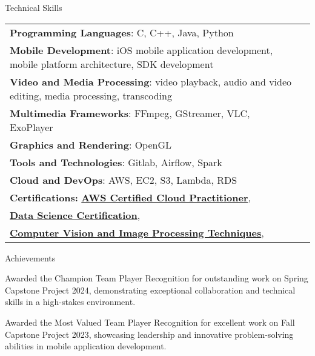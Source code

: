 \documentclass{resume} %
\begin{document}
    \begin{rSection}{Technical Skills}
        \begin{tabular}{ @{} l @{\hspace{1ex}} l }
                                \textbf{Programming Languages}: C, C++, Java, Python\\
                                \textbf{Mobile Development}: iOS mobile application development, mobile platform architecture, SDK development\\
                                \textbf{Video and Media Processing}: video playback, audio and video editing, media processing, transcoding\\
                                \textbf{Multimedia Frameworks}: FFmpeg, GStreamer, VLC, ExoPlayer\\
                                \textbf{Graphics and Rendering}: OpenGL\\
                                \textbf{Tools and Technologies}: Gitlab, Airflow, Spark\\
                                \textbf{Cloud and DevOps}: AWS, EC2, S3, Lambda, RDS\\
                        \textbf{Certifications:} 
                                            \href{None}{\textbf{AWS Certified Cloud Practitioner}},\\
                                            \href{None}{\textbf{Data Science Certification}},\\
                                            \href{None}{\textbf{Computer Vision and Image Processing Techniques}},\\
                                 
        \end{tabular}
    \end{rSection}
 

    \begin{rSection}{Achievements}
        \begin{rSubsection}{}{}{}
                            \item Awarded the Champion Team Player Recognition for outstanding work on Spring Capstone Project 2024, demonstrating exceptional collaboration and technical skills in a high{-}stakes environment.
                            \item Awarded the Most Valued Team Player Recognition for excellent work on Fall Capstone Project 2023, showcasing leadership and innovative problem{-}solving abilities in mobile application development.
                    \end{rSubsection}
    \end{rSection}
\end{document}

